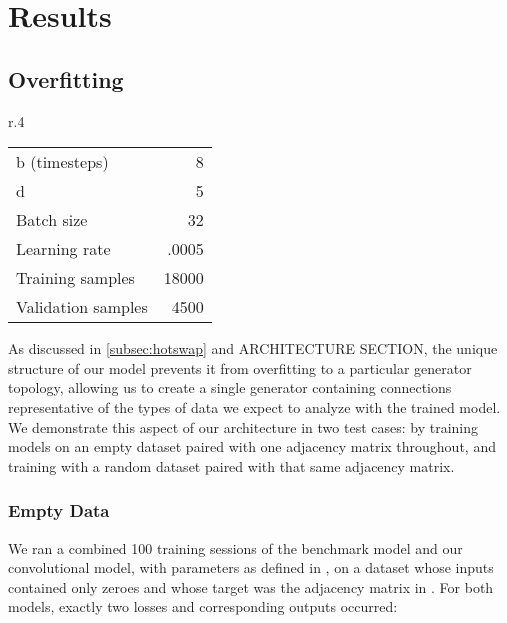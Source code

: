 \graphicspath{ {resources/models/3neurEx/} {resources/models/3neurEx/weights/} } 

\chapter{Results}
\label{results}
\section{Overfitting}
\setlength{\columnsep}{20pt}
\begin{wraptable}[7]{r}{.4\textwidth}
	\captionsetup{justification=centering}
	\vspace{-20pt}
	\begin{tabular}{lr}
		b (timesteps) & 8\\
		d& 5\\
		Batch size& 32\\
		Learning rate& .0005\\
		Training samples& 18000\\
		Validation samples& 4500
	\end{tabular}
	\vspace{-5pt}
	\label{fig:nullparams}
\end{wraptable}
As discussed in \ref{subsec:hotswap} and ARCHITECTURE SECTION, the unique 
structure of our model prevents it from overfitting to a particular generator 
topology, allowing us to create a single generator containing connections 
representative of the types of data we expect to analyze with the trained model.
We demonstrate this aspect of our architecture in two test cases: by training 
models on an empty dataset paired with one adjacency matrix throughout, and 
training with a random dataset paired with that same adjacency matrix.

\subsection{Empty Data}
We ran a combined 100 training sessions of the benchmark model and our 
convolutional model, with parameters as defined in , on a 
dataset whose inputs contained only zeroes and whose target was the adjacency 
matrix in . For both models, exactly two losses 
and corresponding outputs occurred:


